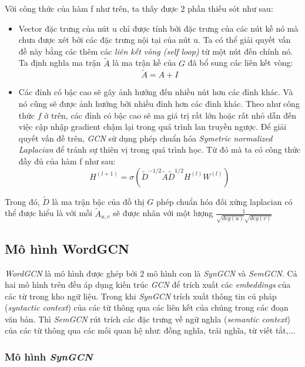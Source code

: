 Với công thức của hàm f như trên, ta thấy được 2 phần thiếu sót như sau:
\begin{itemize}
	\item Vector đặc trưng của nút u chỉ được tính bởi đặc trưng của các nút kề nó mà chưa được xét bởi các đặc trưng nội tại của nút u. Ta có thể giải quyết vấn đề này bằng các thêm các \textit{liên kết vòng (self loop)} từ một nút đến chính nó. Ta định nghĩa ma trận $\tilde{A}$ là ma trận kề của $G$ đã bổ sung các liên kết vòng:
	\begin{equation*}
		\tilde{A} = A + I
	\end{equation*} 
	\item Các đỉnh có bậc cao sẽ gây ảnh hưởng đến nhiều nút hơn các đỉnh khác. Và nó cũng sẽ được ảnh hưởng bởi nhiều đỉnh hơn các đỉnh khác. Theo như công thức $f$ ở trên, các đỉnh có bậc cao sẽ ma giá trị rất lớn hoặc rất nhỏ dẫn đến việc cập nhập gradient chậm lại trong quá trình lan truyền ngược. Để giải quyết vấn đề trên, \textit{GCN} sử dụng phép chuẩn hóa \textit{Symetric normalized Laplacian} để tránh sự thiên vị trong quá trình học.
	Từ đó mà ta có công thức đầy đủ của hàm f như sau:
	\begin{equation*}
		H^{(l+1)} = \sigma(\tilde{D}^{-1/2}\tilde{A}\tilde{D}^{1/2}H^{(l)}W^{(l)})
	\end{equation*}
\end{itemize}

Trong đó, $\tilde{D}$ là ma trận bậc của đồ thị $G$ phép chuẩn hóa đối xứng laplacian có thể được hiểu là với mỗi $\tilde{A}_{u,v}$ sẽ được nhân với một lượng $\frac{1}{\sqrt{deg(u)}\sqrt{deg(v)}}$


\subsection{Mô hình WordGCN}

\textit{WordGCN} là mô hình được ghép bởi 2 mô hình con là \textit{SynGCN} và \textit{SemGCN}. Cả hai mô hình trên đều áp dụng kiến trúc \textit{GCN} để trích xuất các \textit{embeddings} của các từ trong kho ngữ liệu. Trong khi \textit{SynGCN} trích xuất thông tin cú pháp (\textit{syntactic context}) của các từ thông qua các liên kết của chúng trong các đoạn văn bản. Thì \textit{SemGCN} rút trích các đặc trưng về ngữ nghĩa (\textit{semantic context}) của các từ thông qua các mối quan hệ như: đồng nghĩa, trái nghĩa, từ viết tắt,...

\subsubsection{Mô hình \textit{SynGCN}}

